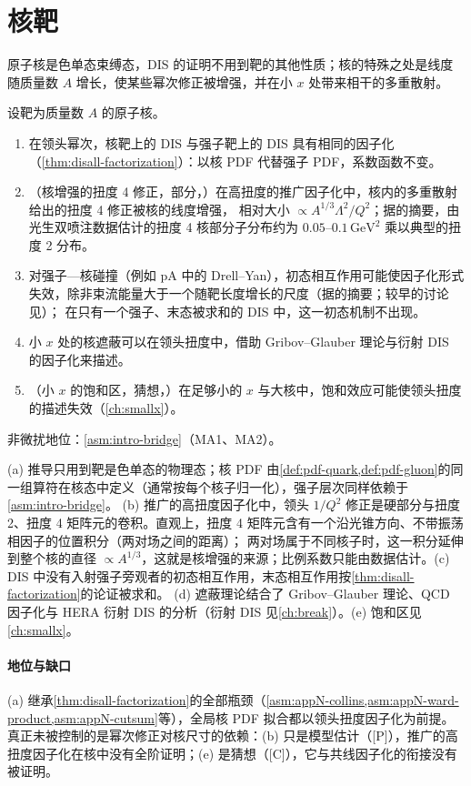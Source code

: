 \section{核靶}\label{sec:disall-nuclear}

原子核是色单态束缚态，DIS 的证明不用到靶的其他性质；核的特殊之处是线度随质量数 $A$ 增长，使某些幂次修正被增强，并在小 $x$ 处带来相干的多重散射。

\begin{proposition}\label{prop:disall-nuclear}
设靶为质量数 $A$ 的原子核。
\begin{enumerate}[label=(\alph*),leftmargin=2em,itemsep=1pt,topsep=2pt]
\item 在领头幂次，核靶上的 DIS 与强子靶上的 DIS 具有相同的因子化（\cref{thm:disall-factorization}）：以核 PDF 代替强子 PDF，系数函数不变。
\item （核增强的扭度 4 修正，部分，\tagP）在高扭度的推广因子化中\cite{QiuSterman1991a}，核内的多重散射给出的扭度 4 修正被核的线度增强，
相对大小 $\propto A^{1/3}\Lambda^2/Q^2$\cite{Luo:1993ui,Luo:1994np}；据\cite{Luo:1993ui}的摘要，由光生双喷注数据估计的扭度 4 核部分子分布约为 $0.05$--$0.1\,\mathrm{GeV}^2$ 乘以典型的扭度 2 分布。
\item 对强子—核碰撞（例如 pA 中的 Drell--Yan），初态相互作用可能使因子化形式失效，除非束流能量大于一个随靶长度增长的尺度（据\cite{Bodwin:1988fs}的摘要；较早的讨论见\cite{BodwinBrodskyLepage1981}）；
在只有一个强子、末态被求和的 DIS 中，这一初态机制不出现。
\item 小 $x$ 处的核遮蔽可以在领头扭度中，借助 Gribov--Glauber 理论与衍射 DIS 的因子化来描述\cite{Frankfurt:2011cs}。
\item （小 $x$ 的饱和区，猜想，\tagC）在足够小的 $x$ 与大核中，饱和效应可能使领头扭度的描述失效（\cref{ch:smallx}）。
\end{enumerate}
非微扰地位：\cref{asm:intro-bridge}（MA1、MA2）。
\end{proposition}

\begin{proofsketch}
(a) 推导只用到靶是色单态的物理态；核 PDF 由\cref{def:pdf-quark,def:pdf-gluon}的同一组算符在核态中定义（通常按每个核子归一化），强子层次同样依赖于\cref{asm:intro-bridge}。
(b) 推广的高扭度因子化中\cite{QiuSterman1991a,QiuSterman1991b}，领头 $1/Q^2$ 修正是硬部分与扭度 2、扭度 4 矩阵元的卷积。直观上，扭度 4 矩阵元含有一个沿光锥方向、不带振荡相因子的位置积分（两对场之间的距离）；
两对场属于不同核子时，这一积分延伸到整个核的直径 $\propto A^{1/3}$，这就是核增强的来源；比例系数只能由数据估计\cite{Luo:1993ui}。(c) DIS 中没有入射强子旁观者的初态相互作用，末态相互作用按\cref{thm:disall-factorization}的论证被求和。
(d) 遮蔽理论结合了 Gribov--Glauber 理论、QCD 因子化与 HERA 衍射 DIS 的分析\cite{Frankfurt:2011cs}（衍射 DIS 见\cref{ch:break}）。(e) 饱和区见\cref{ch:smallx}。
\end{proofsketch}

\paragraph{地位与缺口}
(a) 继承\cref{thm:disall-factorization}的全部瓶颈（\cref{asm:appN-collins,asm:appN-ward-product,asm:appN-cutsum}等），全局核 PDF 拟合都以领头扭度因子化为前提\cite{Eskola:2021nhw,Kovarik:2015cma,AbdulKhalek:2022fyi}。
真正未被控制的是幂次修正对核尺寸的依赖：(b) 只是模型估计（[P]），推广的高扭度因子化在核中没有全阶证明；(e) 是猜想（[C]），它与共线因子化的衔接没有被证明。
